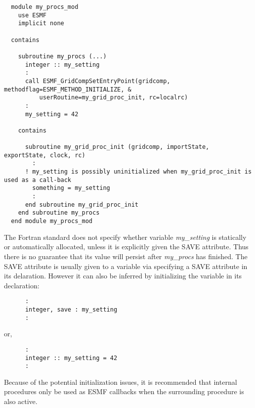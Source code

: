 \begin{verbatim}
  module my_procs_mod
    use ESMF
    implicit none

  contains

    subroutine my_procs (...)
      integer :: my_setting
      :
      call ESMF_GridCompSetEntryPoint(gridcomp, methodflag=ESMF_METHOD_INITIALIZE, &
          userRoutine=my_grid_proc_init, rc=localrc)
      :
      my_setting = 42

    contains

      subroutine my_grid_proc_init (gridcomp, importState, exportState, clock, rc)
        :
      ! my_setting is possibly uninitialized when my_grid_proc_init is used as a call-back
        something = my_setting
        :
      end subroutine my_grid_proc_init
    end subroutine my_procs
  end module my_procs_mod
\end{verbatim}

The Fortran standard does not specify whether variable {\it my\_setting} is statically or
automatically allocated, unless it is explicitly given the SAVE attribute.  Thus there is no
guarantee that its value will persist after {\it my\_procs} has finished.  The SAVE attribute
is usually given to a variable via specifying a SAVE attribute in its delaration.  However it can
also be inferred by initializing the variable in its declaration:

\begin{verbatim}
      :
      integer, save : my_setting
      :
\end{verbatim}

or,

\begin{verbatim}
      :
      integer :: my_setting = 42
      :
\end{verbatim}

Because of the potential initialization issues, it is recommended that internal procedures
only be used as ESMF callbacks when the surrounding procedure is also active.


